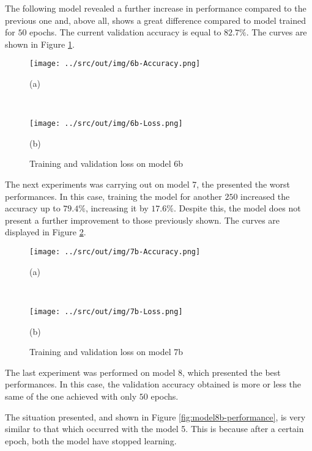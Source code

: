 \documentclass[a4paper,12pt]{article} %
\begin{document}
	The following model revealed a further increase in performance compared to 
	the previous one and, above all, shows a great difference compared to model 
	trained for $50$ epochs. The current validation accuracy is equal to 
	$82.7\%$. The curves are shown in Figure \ref{fig:model6b-performance}.
	
	\begin{figure}[htb]
		\begin{minipage}[c]{.49\textwidth}
			\centering
			\texttt{[image: ../src/out/img/6b-Accuracy.png]}
			\caption*{(a)}
		\end{minipage}
		~
		\begin{minipage}[c]{.49\textwidth}
			\centering
			\texttt{[image: ../src/out/img/6b-Loss.png]}
			\caption*{(b)}
		\end{minipage}
		\caption{Training and validation loss on model 6b}
		\label{fig:model6b-performance}
	\end{figure}

	The next experiments was carrying out on model 7, the presented the worst 
	performances. In this case, training the model for another $250$ increased 
	the accuracy up to $79.4\%$, increasing it by $17.6\%$. Despite this, the 
	model does not present a further improvement to those previously shown.
	The curves are displayed in Figure \ref{fig:model7b-performance}.
	
	\begin{figure}[H]
		\begin{minipage}[c]{.49\textwidth}
			\centering
			\texttt{[image: ../src/out/img/7b-Accuracy.png]}
			\caption*{(a)}
		\end{minipage}
		~
		\begin{minipage}[c]{.49\textwidth}
			\centering
			\texttt{[image: ../src/out/img/7b-Loss.png]}
			\caption*{(b)}
		\end{minipage}
		\caption{Training and validation loss on model 7b}
		\label{fig:model7b-performance}
	\end{figure}

	The last experiment was performed on model 8, which presented the best 
	performances. In this case, the validation accuracy obtained is more or 
	less the same of the one achieved with only $50$ epochs. 
	
	The situation presented, and shown in Figure \ref{fig:model8b-performance}, 
	is very similar to that which occurred with the model 5. This is because 
	after a certain epoch, both the model have stopped learning.
	
\end{document}
